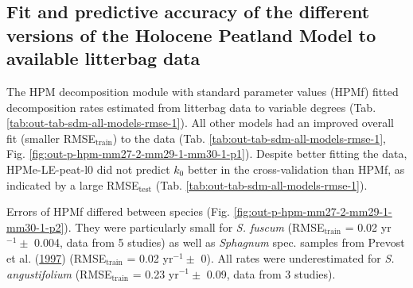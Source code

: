 \documentclass[
  12pt,
]{article}
\begin{document}
\hypertarget{fit-and-predictive-accuracy-of-the-different-versions-of-the-holocene-peatland-model-to-available-litterbag-data}{%
\subsection{Fit and predictive accuracy of the different versions of the Holocene Peatland Model to available litterbag data}\label{fit-and-predictive-accuracy-of-the-different-versions-of-the-holocene-peatland-model-to-available-litterbag-data}}

The HPM decomposition module with standard parameter values (HPMf) fitted decomposition rates estimated from litterbag data to variable degrees (Tab. \ref{tab:out-tab-sdm-all-models-rmse-1}). All other models had an improved overall fit (smaller RMSE\(_\text{train}\)) to the data (Tab. \ref{tab:out-tab-sdm-all-models-rmse-1}, Fig. \ref{fig:out-p-hpm-mm27-2-mm29-1-mm30-1-p1}). Despite better fitting the data, HPMe-LE-peat-l0 did not predict \(k_0\) better in the cross-validation than HPMf, as indicated by a large RMSE\(_\text{test}\) (Tab. \ref{tab:out-tab-sdm-all-models-rmse-1}).

Errors of HPMf differed between species (Fig. \ref{fig:out-p-hpm-mm27-2-mm29-1-mm30-1-p2}). They were particularly small for \emph{S. fuscum} (RMSE\(_\text{train}\) = 0.02 yr\(^{-1} \pm\) 0.004, data from 5 studies) as well as \emph{Sphagnum} spec. samples from Prevost et al. (\protect\hyperlink{ref-Prevost.1997}{1997}) (RMSE\(_\text{train}\) = 0.02 yr\(^{-1} \pm\) 0). All rates were underestimated for \emph{S. angustifolium} (RMSE\(_\text{train}\) = 0.23 yr\(^{-1} \pm\) 0.09, data from 3 studies).
\end{document}
